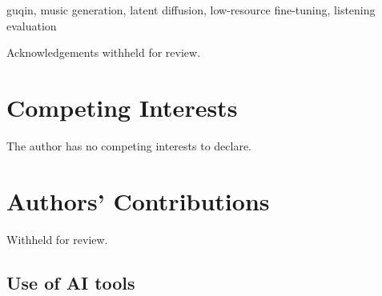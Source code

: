 \documentclass[ProofPDF]{./Styles/Jnls-Template-V3}
\begin{document}
\begin{keyword}[KEYWORDS:]
guqin, music generation, latent diffusion, low-resource fine-tuning, listening evaluation
\end{keyword}

\maketitle

\linenumbers



\nolinenumbers

\begin{acknowledgements}[Acknowledgements]
\ifdefined\anonymous
Acknowledgements withheld for review.
\else
\ackText
\fi
\end{acknowledgements}

\section*{Competing Interests}
The author has no competing interests to declare.

\section*{Authors' Contributions}
\ifdefined\anonymous
Withheld for review.
\else
\contribText
\fi

\subsection*{Use of AI tools}
\aiText

\begin{authoraff}
\end{authoraff}
\clearpage



\label{endPage_Label}
\end{document}
